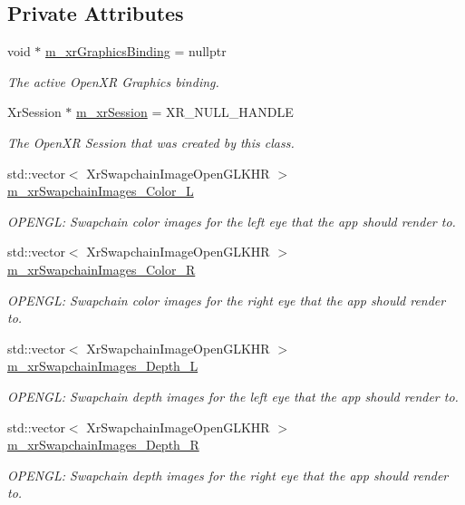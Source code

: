 \subsection*{Private Attributes}
\begin{DoxyCompactItemize}
\item 
void $\ast$ \mbox{\hyperlink{class_open_x_r_provider_1_1_x_r_graphics_a_p_i_ad535f6ce61cdf73d056a90bca80f26bf}{m\+\_\+xr\+Graphics\+Binding}} = nullptr
\begin{DoxyCompactList}\small\item\em The active Open\+XR Graphics binding. \end{DoxyCompactList}\item 
Xr\+Session $\ast$ \mbox{\hyperlink{class_open_x_r_provider_1_1_x_r_graphics_a_p_i_a65e23dceb82b75b9cf0b9e8a4c5f90a5}{m\+\_\+xr\+Session}} = X\+R\+\_\+\+N\+U\+L\+L\+\_\+\+H\+A\+N\+D\+LE
\begin{DoxyCompactList}\small\item\em The Open\+XR Session that was created by this class. \end{DoxyCompactList}\item 
std\+::vector$<$ Xr\+Swapchain\+Image\+Open\+G\+L\+K\+HR $>$ \mbox{\hyperlink{class_open_x_r_provider_1_1_x_r_graphics_a_p_i_a19858e17f839f6742b35e6fb7c44506b}{m\+\_\+xr\+Swapchain\+Images\+\_\+\+Color\+\_\+L}}
\begin{DoxyCompactList}\small\item\em O\+P\+E\+N\+GL\+: Swapchain color images for the left eye that the app should render to. \end{DoxyCompactList}\item 
std\+::vector$<$ Xr\+Swapchain\+Image\+Open\+G\+L\+K\+HR $>$ \mbox{\hyperlink{class_open_x_r_provider_1_1_x_r_graphics_a_p_i_a34305192c60366d37790cca77d1dbcc9}{m\+\_\+xr\+Swapchain\+Images\+\_\+\+Color\+\_\+R}}
\begin{DoxyCompactList}\small\item\em O\+P\+E\+N\+GL\+: Swapchain color images for the right eye that the app should render to. \end{DoxyCompactList}\item 
std\+::vector$<$ Xr\+Swapchain\+Image\+Open\+G\+L\+K\+HR $>$ \mbox{\hyperlink{class_open_x_r_provider_1_1_x_r_graphics_a_p_i_a9a05367721766121eec6e528cb325e7a}{m\+\_\+xr\+Swapchain\+Images\+\_\+\+Depth\+\_\+L}}
\begin{DoxyCompactList}\small\item\em O\+P\+E\+N\+GL\+: Swapchain depth images for the left eye that the app should render to. \end{DoxyCompactList}\item 
std\+::vector$<$ Xr\+Swapchain\+Image\+Open\+G\+L\+K\+HR $>$ \mbox{\hyperlink{class_open_x_r_provider_1_1_x_r_graphics_a_p_i_aa13dbac8a084165d6340f47693e12128}{m\+\_\+xr\+Swapchain\+Images\+\_\+\+Depth\+\_\+R}}
\begin{DoxyCompactList}\small\item\em O\+P\+E\+N\+GL\+: Swapchain depth images for the right eye that the app should render to. \end{DoxyCompactList}\end{DoxyCompactItemize}


